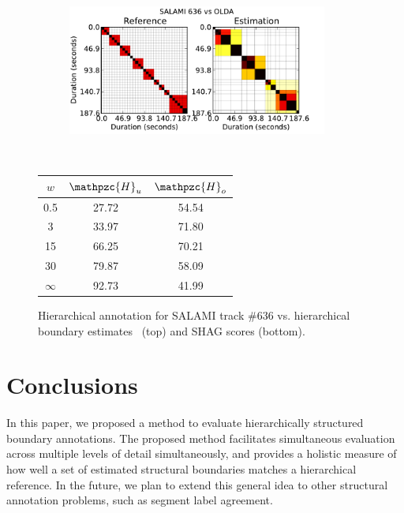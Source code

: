 \documentclass{article}
\def\shag{\ensuremath{\mathpzc{H}}}
\begin{document}
\begin{figure}[t]
  \centering
  \begin{subfigure}{0.5\textwidth}
    \centering
    \includegraphics[width=0.94\textwidth]{plots/SALAMI-OLDA.pdf}
  \end{subfigure}%
  \\
  \begin{minipage}{0.5\textwidth}
    \centering
    \vspace{10pt}
    \begin{tabular}{|c|c|c|}
      \hline
      $w$       & $\shag_u$       & $\shag_o$      \\
      \hline
      0.5       & 27.72       & 54.54      \\     
      3         & 33.97       & 71.80      \\
      15        & 66.25       & 70.21    \\
      30        & 79.87       & 58.09    \\
      $\infty$  & 92.73       & 41.99    \\
      \hline
    \end{tabular}
  \end{minipage}
  \caption{Hierarchical annotation for SALAMI track \#636 vs. hierarchical boundary
  estimates~\cite{McFee2014} (top) and SHAG scores (bottom).}
  \label{fig:SALAMI-OLDA}
\end{figure}




\section{Conclusions}\label{sec:conclusions}

In this paper, we proposed a method to evaluate hierarchically structured boundary annotations.  The proposed method facilitates simultaneous evaluation across multiple levels of
detail simultaneously, and provides a holistic measure of how well a set of estimated structural boundaries matches a hierarchical reference.  In the future, we plan to extend this
general idea to other structural annotation problems, such as segment label agreement.



%
\end{document}
